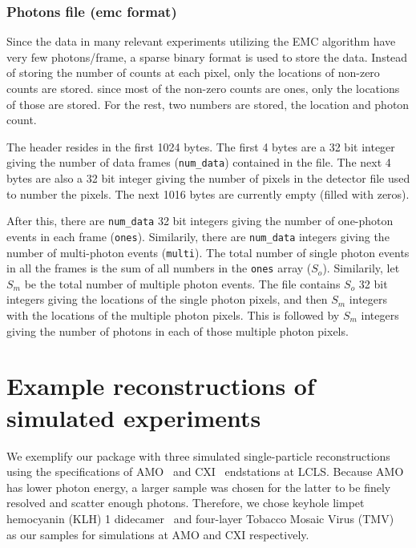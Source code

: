 \documentclass[]{iucr}              %
\begin{document}
\subsubsection{Photons file (emc format)}\label{subsubsec:emcformat}
Since the data in many relevant experiments utilizing the EMC algorithm have very few photons/frame, a sparse binary format is used to store the data. Instead of storing the number of counts at each pixel, only the locations of non-zero counts are stored. since most of the non-zero counts are ones, only the locations of those are stored. For the rest, two numbers are stored, the location and photon count. 

The header resides in the first 1024 bytes. The first 4 bytes are a 32 bit integer giving the number of data frames (\texttt{num\_data}) contained in the file. The next 4 bytes are also a 32 bit integer giving the number of pixels in the detector file used to number the pixels. The next 1016 bytes are currently empty (filled with zeros).

After this, there are \texttt{num\_data} 32 bit integers giving the number of one-photon events in each frame (\texttt{ones}). Similarily, there are \texttt{num\_data} integers giving the number of multi-photon events (\texttt{multi}). The total number of single photon events in all the frames is the sum of all numbers in the \texttt{ones} array ($S_o$). Similarily, let $S_m$ be the total number of multiple photon events. The file contains $S_o$ 32 bit integers giving the locations of the single photon pixels, and then $S_m$ integers with the locations of the multiple photon pixels. This is followed by $S_m$ integers giving the number of photons in each of those multiple photon pixels. 

\section{Example reconstructions of simulated experiments}\label{sec:simulations}

We exemplify our package with three simulated single-particle reconstructions using the specifications of AMO~\cite{ferguson2015} and CXI~\cite{liang2015} endstations at LCLS. Because AMO has lower photon energy, a larger sample was chosen for the latter to be finely resolved and scatter enough photons. Therefore, we chose keyhole limpet hemocyanin (KLH) 1 didecamer~\cite{gatsogiannis2009} and four-layer Tobacco Mosaic Virus (TMV)~\cite{bhyravbhatla1998} as our samples for simulations at AMO and CXI respectively.
\end{document}
